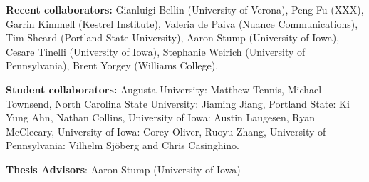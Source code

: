 \textbf{Recent collaborators:} Gianluigi Bellin (University of
Verona), Peng Fu (XXX), Garrin Kimmell (Kestrel Institute), Valeria de
Paiva (Nuance Communications), Tim Sheard (Portland State University),
Aaron Stump (University of Iowa), Cesare Tinelli (University of Iowa),
Stephanie Weirich (University of Pennsylvania), Brent Yorgey (Williams
College).

\textbf{Student collaborators:} Augusta University: Matthew Tennis,
Michael Townsend, North Carolina State University: Jiaming Jiang,
Portland State: Ki Yung Ahn, Nathan Collins, University of Iowa:
Austin Laugesen, Ryan McCleeary, University of Iowa: Corey Oliver,
Ruoyu Zhang, University of Pennsylvania: Vilhelm Sj{\"o}berg and Chris
Casinghino.

\textbf{Thesis Advisors}: Aaron Stump (University of Iowa)
